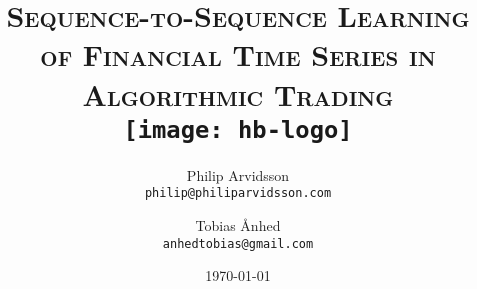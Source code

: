 \title{
  \fontsize{24}{24}\selectfont
  \textsc{Sequence-to-Sequence Learning of Financial Time Series in
           Algorithmic Trading} \\
  \vspace{10ex}
  \texttt{[image: hb-logo]}
  \vspace{8ex}
}

\author{
       \huge{Philip Arvidsson} \\ \large{\texttt{philip@philiparvidsson.com}}
  \and \huge{Tobias Ånhed}     \\ \large{\texttt{anhedtobias@gmail.com}}
}

\date{\vspace{10ex}\LARGE\today}
